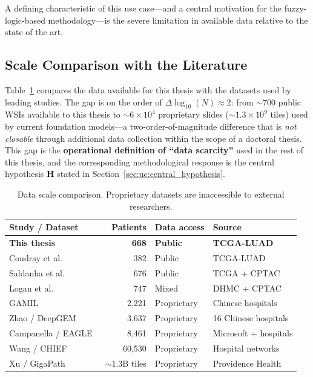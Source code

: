 A defining characteristic of this use case---and a central motivation
for the fuzzy-logic-based methodology---is the severe limitation in
available data relative to the state of the art.

\subsection{Scale Comparison with the Literature}
\label{sec:uc:data_scarcity:comparison}

Table~\ref{tab:data_scale} compares the data available for this thesis
with the datasets used by leading studies.
The gap is on the order of $\Delta\log_{10}(N) \approx 2$:
from $\sim 700$ public WSIs available to this thesis to
$\sim 6 \times 10^4$ proprietary slides
($\sim 1.3 \times 10^9$ tiles) used by current foundation models---a
two-order-of-magnitude difference that is \emph{not closable} through
additional data collection within the scope of a doctoral thesis.
This gap is the \textbf{operational definition of ``data scarcity''}
used in the rest of this thesis, and the corresponding methodological
response is the central hypothesis $\mathbf{H}$ stated in
Section~\ref{sec:uc:central_hypothesis}.

\begin{table}[ht!]
\centering
\caption{Data scale comparison. Proprietary datasets are inaccessible to
external researchers.}
\label{tab:data_scale}
\begin{tabular}{l r l l}
\hline
\textbf{Study / Dataset} & \textbf{Patients} & \textbf{Data access} &
\textbf{Source} \\
\hline
\textbf{This thesis} & \textbf{668} & \textbf{Public} &
\textbf{TCGA-LUAD} \\
\hline
Coudray et al.~\cite{coudray2018classification} & 382 & Public & TCGA-LUAD \\
Saldanha et al.~\cite{saldanha2023npj} & 676 & Public & TCGA + CPTAC \\
Logan et al.~\cite{logan2022medrxiv} & 747 & Mixed & DHMC + CPTAC \\
GAMIL~\cite{gamil2025diagpath} & 2,221 & Proprietary & Chinese hospitals \\
Zhao / DeepGEM~\cite{zhao2025deepgem} & 3,637 & Proprietary & 16 Chinese hospitals \\
Campanella / EAGLE~\cite{campanella2025eagle} & 8,461 & Proprietary & Microsoft + hospitals \\
Wang / CHIEF~\cite{wang2024chief} & 60,530 & Proprietary & Hospital networks \\
Xu / GigaPath~\cite{xu2024gigapath} & $\sim$1.3B tiles & Proprietary & Providence Health \\
\hline
\end{tabular}
\end{table}


